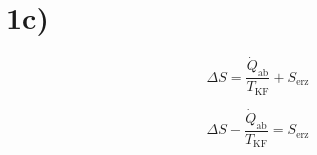 

\section*{1c)}

\[
\Delta S = \frac{\dot{Q}_{\text{ab}}}{T_{\text{KF}}} + S_{\text{erz}}
\]

\[
\Delta S - \frac{\dot{Q}_{\text{ab}}}{T_{\text{KF}}} = S_{\text{erz}}
\]